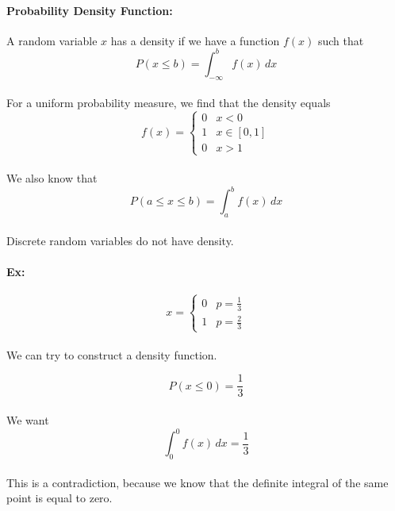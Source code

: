 \documentclass{article}
\begin{document}
\paragraph{Probability Density Function:} A random variable $x$ has a density if
we have a function $f(x)$ such that 
\[
    P(x \le b) = \int_{-\infty}^{b} f(x)\,dx 
\]
\paragraph{}For a uniform probability measure, we find that the density equals
\[ f(x) = \begin{cases}
    0 & x < 0 \\
    1 & x \in [0,1] \\
    0 & x > 1
    \end{cases}
\]
\paragraph{}We also know that 
\[
    P(a \le x \le b) = \int_a^b f(x)\, dx 
\]
\paragraph{}Discrete random variables do not have density.

\paragraph{Ex:}
\[ x = \begin{cases}
    0 & p = \frac{1}{3} \\
    1 & p = \frac{2}{3}
    \end{cases}
\]

\paragraph{}We can try to construct a density function.

\[
    P(x \le 0) = \frac{1}{3} 
\]

\paragraph{}We want
\[
    \int_{0}^{0} f(x)\,dx = \frac{1}{3}
\]
\paragraph{}This is a contradiction, because we know that the definite integral of the same point is equal to zero.
\end{document}
